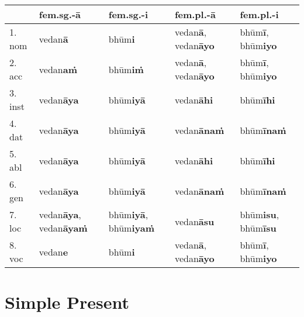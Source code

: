 \documentclass[a4paper]{memoir}
\begin{document}
\begin{center}
\begin{tabular}{lllll}
 & \textbf{fem.sg.-ā} & \textbf{fem.sg.-i} & \textbf{fem.pl.-ā} & \textbf{fem.pl.-i}\\[0pt]
\hline
1. nom & vedan\textbf{ā} & bhūm\textbf{i} & vedan\textbf{ā}, vedan\textbf{āyo} & bhūm\textbf{ī}, bhūm\textbf{iyo}\\[0pt]
2. acc & vedan\textbf{aṁ} & bhūm\textbf{iṁ} & vedan\textbf{ā}, vedan\textbf{āyo} & bhūm\textbf{ī}, bhūm\textbf{iyo}\\[0pt]
3. inst & vedan\textbf{āya} & bhūm\textbf{iyā} & vedan\textbf{āhi} & bhūm\textbf{īhi}\\[0pt]
4. dat & vedan\textbf{āya} & bhūm\textbf{iyā} & vedan\textbf{ānaṁ} & bhūm\textbf{īnaṁ}\\[0pt]
5. abl & vedan\textbf{āya} & bhūm\textbf{iyā} & vedan\textbf{āhi} & bhūm\textbf{īhi}\\[0pt]
6. gen & vedan\textbf{āya} & bhūm\textbf{iyā} & vedan\textbf{ānaṁ} & bhūm\textbf{īnaṁ}\\[0pt]
7. loc & vedan\textbf{āya}, vedan\textbf{āyaṁ} & bhūm\textbf{iyā}, bhūm\textbf{iyaṁ} & vedan\textbf{āsu} & bhūm\textbf{isu}, bhūm\textbf{īsu}\\[0pt]
8. voc & vedan\textbf{e} & bhūm\textbf{i} & vedan\textbf{ā}, vedan\textbf{āyo} & bhūm\textbf{ī}, bhūm\textbf{iyo}\\[0pt]
\end{tabular}
\end{center}

\clearpage

\section{Simple Present}
\label{sec:orgf67452c}
\end{document}
